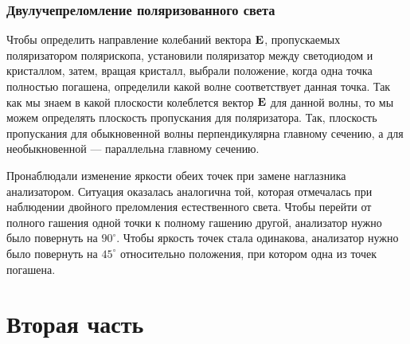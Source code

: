 \documentclass[12pt]{article}
\begin{document}
	\subsubsection{Двулучепреломление поляризованного света}
	Чтобы определить направление колебаний вектора $\vb{E}$, пропускаемых поляризатором полярископа, установили поляризатор между светодиодом и кристаллом, затем, вращая кристалл, выбрали положение, когда одна точка полностью погашена, определили какой волне соответствует данная точка. Так как мы знаем в какой плоскости колеблется вектор $\vb{E}$ для данной волны, то мы можем определять плоскость пропускания для поляризатора. Так, плоскость пропускания для обыкновенной волны перпендикулярна главному сечению, а для необыкновенной \---- параллельна главному сечению.
	\par Пронаблюдали изменение яркости обеих точек при замене наглазника анализатором. Ситуация оказалась аналогична той, которая отмечалась при наблюдении двойного преломления естественного света. Чтобы перейти от полного гашения одной точки к полному гашению другой, анализатор нужно было повернуть на $90^\circ$. Чтобы яркость точек стала одинакова, анализатор нужно было повернуть на $45^\circ$ относительно положения, при котором одна из точек погашена.

	\section{Вторая часть}
\end{document}

